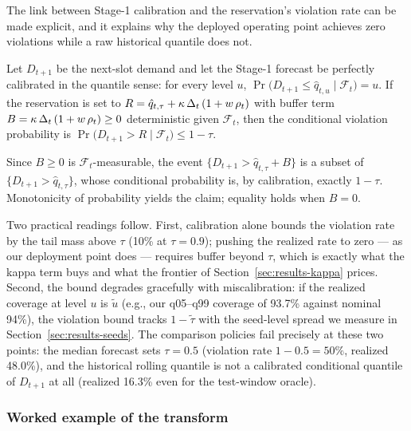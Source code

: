 The link between Stage-1 calibration and the reservation's violation
rate can be made explicit, and it explains why the deployed operating
point achieves zero violations while a raw historical quantile does
not.

\begin{proposition}
\label{prop:bound}
Let $D_{t+1}$ be the next-slot demand and let the Stage-1 forecast be
perfectly calibrated in the quantile sense: for every level $u$,
$\Pr\bigl(D_{t+1} \le \hat q_{t,u} \mid \mathcal{F}_t\bigr) = u$.
If the reservation is set to
$R = \hat q_{t,\tau} + \kappa\,\Delta_t\,(1 + w\,\rho_t)$ with buffer
term $B = \kappa\,\Delta_t\,(1 + w\,\rho_t) \ge 0$ deterministic given
$\mathcal{F}_t$, then the conditional violation probability is
$\Pr\bigl(D_{t+1} > R \mid \mathcal{F}_t\bigr) \le 1 - \tau$.
\end{proposition}
\begin{IEEEproof}
Since $B \ge 0$ is $\mathcal{F}_t$-measurable, the event
$\{D_{t+1} > \hat q_{t,\tau} + B\}$ is a subset of
$\{D_{t+1} > \hat q_{t,\tau}\}$, whose conditional probability is, by
calibration, exactly $1 - \tau$. Monotonicity of probability yields
the claim; equality holds when $B = 0$.
\end{IEEEproof}

Two practical readings follow. First, calibration alone bounds the
violation rate by the tail mass above $\tau$ (10\% at $\tau = 0.9$);
pushing the realized rate to zero --- as our deployment point does
--- requires buffer beyond $\tau$, which is exactly what the kappa
term buys and what the frontier of Section~\ref{sec:results-kappa}
prices. Second, the bound degrades gracefully with miscalibration:
if the realized coverage at level $u$ is $\tilde u$ (e.g., our
q05--q99 coverage of 93.7\% against nominal 94\%), the violation
bound tracks $1 - \tilde\tau$ with the seed-level spread we measure
in Section~\ref{sec:results-seeds}. The comparison policies fail
precisely at these two points: the median forecast sets $\tau =
0.5$ (violation rate $1 - 0.5 = 50\%$, realized 48.0\%), and the
historical rolling quantile is not a calibrated conditional quantile
of $D_{t+1}$ at all (realized 16.3\% even for the test-window
oracle).

\subsubsection{Worked example of the transform}

